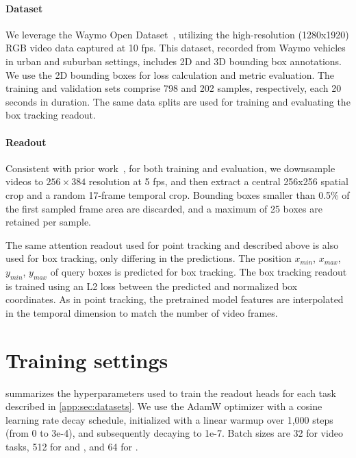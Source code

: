 \paragraph{Dataset}
We leverage the Waymo Open Dataset~\cite{waymo}, utilizing the high-resolution (1280x1920) RGB video data captured at 10 fps. This dataset, recorded from Waymo vehicles in urban and suburban settings, includes 2D and 3D bounding box annotations. We use the 2D bounding boxes for loss calculation and metric evaluation. The training and validation sets comprise 798 and 202 samples, respectively, each 20 seconds in duration. The same data splits are used for training and evaluating the box tracking readout.

\paragraph{Readout}
Consistent with prior work~\cite{moog}, for both training and evaluation, we downsample videos to $256\times384$ resolution at 5 fps, and then extract a central 256x256 spatial crop and a random 17-frame temporal crop. Bounding boxes smaller than 0.5\% of the first sampled frame area are discarded, and a maximum of 25 boxes are retained per sample.

The same attention readout used for point tracking and described above is also used for box tracking, only differing in the predictions. The position $x_{min}$, $x_{max}$, $y_{min}$, $y_{max}$ of query boxes is predicted for box tracking. The box tracking readout is trained using an L2 loss between the predicted and normalized box coordinates. As in point tracking, the pretrained model features are interpolated in the temporal dimension to match the number of video frames. 

\section{Training settings}
\label{app:sec:training_details}
 summarizes the hyperparameters used to train the readout heads for each task described in \cref{app:sec:datasets}. We use the AdamW optimizer with a cosine learning rate decay schedule, initialized with a linear warmup over 1,000 steps (from 0 to 3e-4), and subsequently decaying to 1e-7. Batch sizes are 32 for video tasks, 512 for \Tplaces and \Tinat, and 64 for \Timagenet.





 



